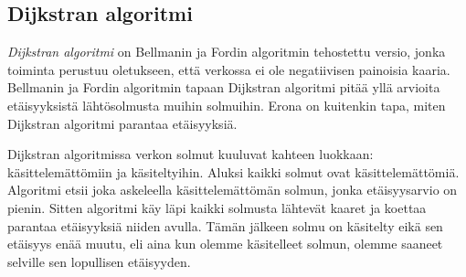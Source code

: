 \subsection{Dijkstran algoritmi}


\emph{Dijkstran algoritmi} on Bellmanin ja Fordin algoritmin tehostettu versio,
jonka toiminta perustuu oletukseen, että verkossa ei ole
negatiivisen painoisia kaaria.
Bellmanin ja Fordin algoritmin tapaan Dijkstran algoritmi pitää
yllä arvioita etäisyyksistä lähtösolmusta muihin solmuihin.
Erona on kuitenkin tapa, miten Dijkstran algoritmi parantaa etäisyyksiä.

Dijkstran algoritmissa verkon solmut kuuluvat kahteen luokkaan:
käsitte\-lemättömiin ja käsiteltyihin.
Aluksi kaikki solmut ovat käsittelemättömiä.
Algoritmi etsii joka askeleella käsittelemättömän solmun,
jonka etäisyys\-arvio on pienin.
Sitten algoritmi käy läpi kaikki solmusta lähtevät kaaret ja
koettaa parantaa etäisyyksiä niiden avulla.
Tämän jälkeen solmu on käsitelty eikä sen etäisyys enää muutu,
eli aina kun olemme käsitelleet solmun,
olemme saaneet selville sen lopullisen etäisyyden.

